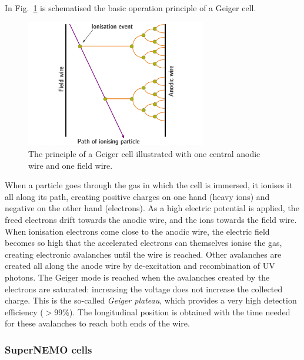 In Fig.~\ref{fig:geiger_avalanche} is schematised the basic operation principle of a Geiger cell.
\begin{figure}[h!]
\centering
\includegraphics[width=0.7\textwidth]{SNdemonstrator/fig_SNdemonstrator/geiger_avalanche.pdf}
\caption{The principle of a Geiger cell illustrated with one central anodic wire and one field wire.
\label{fig:geiger_avalanche}}
\end{figure}
When a particle goes through the gas in which the cell is immersed, it ionises it all along its path, creating positive charges on one hand (heavy ions) and negative on the other hand (electrons).
As a high electric potential is applied, the freed electrons drift towards the anodic wire, and the ions towards the field wire.
When ionisation electrons come close to the anodic wire, the electric field becomes so high that the accelerated electrons can themselves ionise the gas, creating electronic avalanches until the wire is reached.
Other avalanches are created all along the anode wire by de-excitation and recombination of UV photons.
The Geiger mode is reached when the avalanches created by the electrons are saturated: increasing the voltage does not increase the collected charge.
This is the so-called \emph{Geiger plateau}, which provides a very high detection efficiency ($>99$\%).
The longitudinal position is obtained with the time needed for these avalanches to reach both ends of the wire.


\subsubsection*{SuperNEMO cells}

